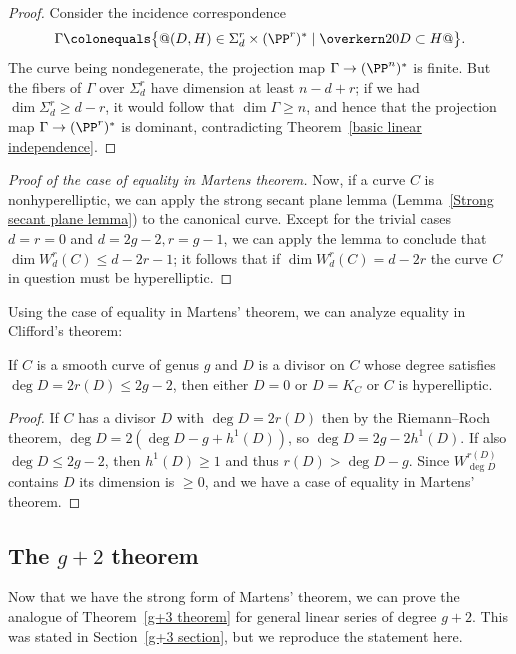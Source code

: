 \begin{proof}
Consider the incidence correspondence
$$
\Gamma \colonequals  \bigl\{@(D, H) \in \Sigma^r_d\times 
(\PP^r)^*
\mid \overkern20 D \subset H@\bigr\}.
$$
The curve being nondegenerate, the projection map $\Gamma \to  (\PP^n)^*$
is finite. But the fibers of $\Gamma$ over $\Sigma^r_d$ have dimension
at least $n-d+r$; if we had $\dim \Sigma^r_d \geq d-r$, it would follow
that $\dim \Gamma \geq n$, and hence that the projection map $\Gamma
\to  (\PP^r)^*$ is dominant, contradicting Theorem~\ref{basic
linear independence}.
\end{proof}

\begin{proof}[Proof of the case of equality in Martens theorem]
 Now, if a curve $C$ is nonhyperelliptic, we can apply the 
strong secant plane lemma
%
(Lemma~\ref{Strong secant plane lemma})
 to the 
canonical curve.
%
Except for the trivial cases $d=r=0$
 and $d=2g-2, r=g-1$,
 we can apply 
the lemma
to conclude that
 $\dim W^r_d(C) \leq d-2r-1$; it follows that if 
$\dim W^r_d(C)
 = d-2r$ the curve $C$ in question must be hyperelliptic.
\unif
\end{proof}

Using the case of equality in Martens' theorem, we can analyze equality in
Clifford's theorem:
%

\begin{corollary}\label{equality in Clifford from Martens}
If $C$ is a smooth curve of genus $g$ and $D$ 
is
a divisor on $C$ 
whose degree satisfies $\deg D = 2r(D)\le 2g-2$,
then either $D =0$ or $D=K_C$ or $C$
is hyperelliptic.
\unif
\end{corollary}

\begin{proof}
If $C$ has a divisor $D$ with $\deg D =2 r(D)$ then by the Riemann--Roch
theorem,  $\deg D  = 2(\deg D-g+h^1(D))$,
so $\deg D = 2g-2h^1(D)$. If also $\deg D\leq 2g-2$, then $h^1(D) \geq 1$
and thus $r(D) >\deg D-g$. Since $W^{r(D)}_{\deg D}$ contains $D$
its dimension
is $\geq 0$, and we have a case of equality in Martens' theorem.
\end{proof}


\subsection*{The $g+2$ theorem}

Now that we have the strong form of Martens' theorem, we can prove the
analogue of Theorem~\ref{g+3 theorem} for general linear series of degree
$g+2$. This was stated in Section~\ref{g+3 section}, but 
we
reproduce
the statement here.
%

